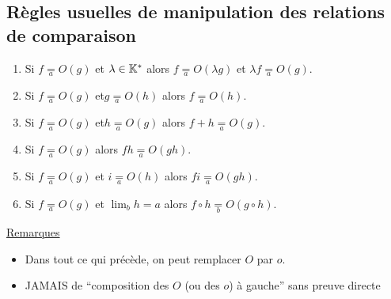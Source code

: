 \subsection{Règles usuelles de manipulation des relations de comparaison}

\begin{defprop}
    \begin{enumerate}
    \item Si \(f \underset{a}{=} O(g)\) et \(\lambda  \in  \mathbb{K}^*\) alors \(f \underset{a}{=}  O(\lambda  g)\) et \(\lambda f \underset{a}{=} O(g)\).
    \item Si \(f \underset{a}{=} O(g)\) et\( g \underset{a}{=} O(h)\) alors \(f \underset{a}{=} O(h)\).
    \item Si \(f \underset{a}{=} O(g)\) et\( h \underset{a}{=} O(g)\) alors \(f + h \underset{a}{=} O(g)\).
    \item Si \(f \underset{a}{=} O(g)\) alors \(f h \underset{a}{=} O(gh)\).
    \item Si \(f \underset{a}{=} O(g)\) et \(i \underset{a}{=} O(h)\) alors \(f i \underset{a}{=} O(gh)\).
    \item Si \(f \underset{a}{=} O(g)\) et \(\lim_{b} h = a\) alors \(f \circ h \underset{b}{=} O(g \circ h)\).
    \end{enumerate}
\underline{Remarques}
    \begin{itemize}
        \item Dans tout ce qui précède, on peut remplacer \(O\) par \(o\).
        \item JAMAIS de “composition des \(O\) (ou des \(o\)) à gauche” sans preuve directe
    \end{itemize}
\end{defprop}

